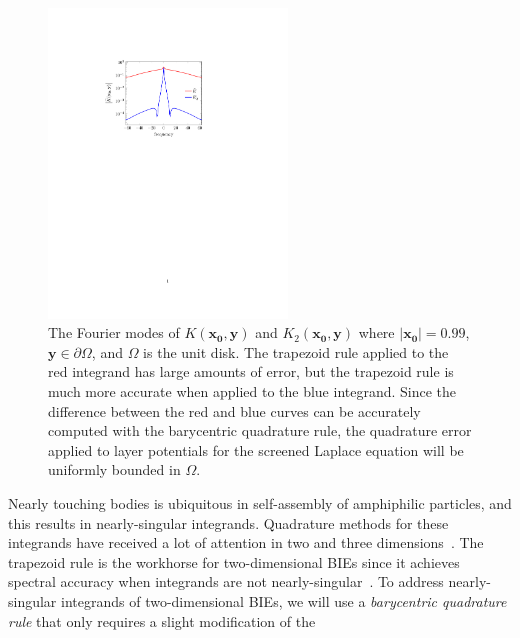 %
\begin{figure}
\centerline{\includegraphics[width=2.5in]{figures/integrands}}
\vspace*{-13pt}
  \caption{{\footnotesize The Fourier modes of
  $K(\mathbf{x_0},\mathbf{y})$ and $K_2(\mathbf{x_0},\mathbf{y})$ where
  $|\mathbf{x_0}| = 0.99$, $\mathbf{y} \in \partial\Omega$, and
  $\Omega$ is the unit disk. The trapezoid rule applied to the red
  integrand has large amounts of error, but the trapezoid rule is much
  more accurate when applied to the blue integrand. Since the difference
  between the red and blue curves can be accurately computed with the
  barycentric quadrature rule, the quadrature error applied to layer
  potentials for the screened Laplace equation will be uniformly bounded
  in $\Omega$.}}
\label{fig:integrands}
\end{figure}
Nearly touching bodies is ubiquitous in self-assembly of amphiphilic
particles, and this results in nearly-singular integrands. Quadrature
methods for these integrands have received a lot of attention in two and
three dimensions~\cite{alpert, kapur, sidi, duffy, bruno1, bruno2,
davis_1984, graglia_2008, hackbusch_sauter_1994, jarvenpaa_2003,
khayat_2005, schwab_1992, ying_2006, beale1, schwab_1992, ggq1, ggq2,
ggq3, helsing_2008a, helsing_tutorial_2012, klockner2013jcp, qbx2,
wala2019jcp, af2018sisc, siegel2018jcp, rachh2017jcp, ding2019arxiv,
bar2014}. The trapezoid rule is the workhorse for two-dimensional BIEs
since it achieves spectral accuracy when integrands are not
nearly-singular~\cite{tre-wei2014}. To address nearly-singular
integrands of two-dimensional BIEs, we will use a {\em barycentric
quadrature rule} that only requires a slight modification of the
